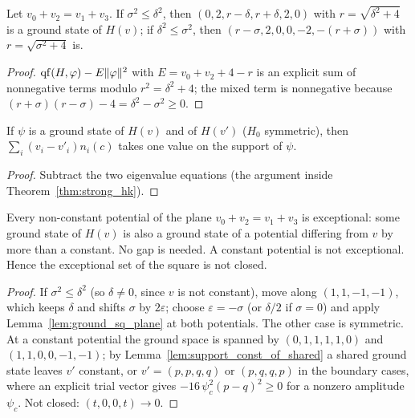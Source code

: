 \begin{lemma}
  \label{lem:ground_sq_plane}
  \leanok
  Let $v_0+v_2=v_1+v_3$. If $\sigma^2\le\delta^2$, then $(0,2,r-\delta,r+\delta,2,0)$ with $r=\sqrt{\delta^2+4}$ is a
  ground state of $H(v)$; if $\delta^2\le\sigma^2$, then $(r-\sigma,2,0,0,-2,-(r+\sigma))$ with $r=\sqrt{\sigma^2+4}$ is.
\end{lemma}
\begin{proof}
  \leanok
  $\operatorname{qf}(H,\varphi)-E\|\varphi\|^2$ with $E=v_0+v_2+4-r$ is an explicit sum of nonnegative terms modulo $r^2=\delta^2+4$; the
  mixed term is nonnegative because $(r+\sigma)(r-\sigma)-4=\delta^2-\sigma^2\ge0$.
\end{proof}

\begin{lemma}
  \label{lem:support_const_of_shared}
  \leanok
  If $\psi$ is a ground state of $H(v)$ and of $H(v')$ ($H_0$ symmetric), then $\sum_i(v_i-v'_i)n_i(c)$ takes one value
  on the support of $\psi$.
\end{lemma}
\begin{proof}
  \leanok
  Subtract the two eigenvalue equations (the argument inside Theorem~\ref{thm:strong_hk}).
\end{proof}

\begin{theorem}
  \label{thm:square_plane}
  \leanok
  Every non-constant potential of the plane $v_0+v_2=v_1+v_3$ is exceptional: some ground state of $H(v)$ is also a
  ground state of a potential differing from $v$ by more than a constant. No gap is needed. A constant potential is
  not exceptional. Hence the exceptional set of the square is not closed.
\end{theorem}
\begin{proof}
  \leanok
  If $\sigma^2\le\delta^2$ (so $\delta\ne0$, since $v$ is not constant), move along $(1,1,-1,-1)$, which keeps $\delta$
  and shifts $\sigma$ by $2\varepsilon$; choose $\varepsilon=-\sigma$ (or $\delta/2$ if $\sigma=0$) and apply
  Lemma~\ref{lem:ground_sq_plane} at both potentials. The other case is symmetric. At a constant potential the ground
  space is spanned by $(0,1,1,1,1,0)$ and $(1,1,0,0,-1,-1)$; by Lemma~\ref{lem:support_const_of_shared} a shared
  ground state leaves $v'$ constant, or $v'=(p,p,q,q)$ or $(p,q,q,p)$ in the boundary cases, where an explicit trial
  vector gives $-16\,\psi_c^2(p-q)^2\ge0$ for a nonzero amplitude $\psi_c$. Not closed: $(t,0,0,t)\to0$.
\end{proof}

